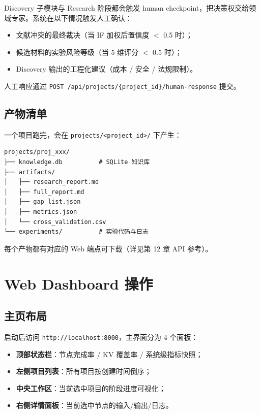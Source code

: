 \documentclass[11pt,a4paper]{article}
\begin{document}
Discovery 子模块与 Research 阶段都会触发 human checkpoint，把决策权交给领域专家。系统在以下情况触发人工确认：
\begin{itemize}[leftmargin=2em]
\item 文献冲突的最终裁决（当 IF 加权后置信度 $<$ 0.5 时）；
\item 候选材料的实验风险等级（当 5 维评分 $<$ 0.5 时）；
\item Discovery 输出的工程化建议（成本 / 安全 / 法规限制）。
\end{itemize}

人工响应通过 \texttt{POST /api/projects/\{project\_id\}/human-response} 提交。

\subsection{产物清单}

一个项目跑完，会在 \texttt{projects/<project\_id>/} 下产生：

\begin{verbatim}
projects/proj_xxx/
├── knowledge.db          # SQLite 知识库
├── artifacts/
│   ├── research_report.md
│   ├── full_report.md
│   ├── gap_list.json
│   ├── metrics.json
│   └── cross_validation.csv
└── experiments/          # 实验代码与日志
\end{verbatim}

每个产物都有对应的 Web 端点可下载（详见第 12 章 API 参考）。

\section{Web Dashboard 操作}

\subsection{主页布局}

启动后访问 \texttt{http://localhost:8000}，主界面分为 4 个面板：
\begin{itemize}[leftmargin=2em]
\item \textbf{顶部状态栏}：节点完成率 / KV 覆盖率 / 系统级指标快照；
\item \textbf{左侧项目列表}：所有项目按创建时间倒序；
\item \textbf{中央工作区}：当前选中项目的阶段进度可视化；
\item \textbf{右侧详情面板}：当前选中节点的输入/输出/日志。
\end{itemize}
\end{document}
